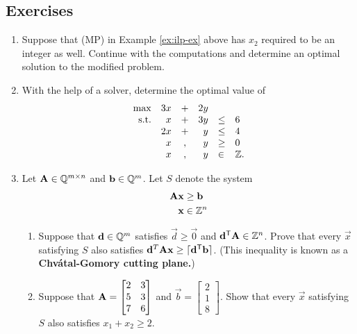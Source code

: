 \subsection*{Exercises}\label{exercises-10}

\begin{enumerate}
\def\labelenumi{\arabic{enumi}.}
\item
  Suppose that (MP) in Example \ref{ex:ilp-ex} above has \(x_2\)
  required to be an integer as well. Continue with the computations and
  determine an optimal solution to the modified problem.
\item
  With the help of a solver, determine the optimal value of
  \[\begin{array}{rrcrll}
  \max & 3x & + & 2y & \\
  \mbox{s.t.} 
  & x & + & 3y & \leq & 6 \\
  & 2x & +&  y & \leq & 4 \\
  & x & ,& y & \geq & 0 \\
  & x &,& y & \in  & {\mathbb{Z}}. \\
  \end{array}\]
\item
  Let \(\mathbf{A} \in {\mathbb{Q}}^{m\times n}\) and \(\mathbf{b} \in {\mathbb{Q}}^m\). Let
  \(S\) denote the system
  \begin{align*}
    \mathbf{A} \mathbf{x} & \geq \mathbf{b}\\
    \mathbf{x} & \in {\mathbb{Z}}^n
  \end{align*}

  \begin{enumerate}
  \def\labelenumii{\alph{enumii}.}
  \item
    Suppose that \(\mathbf{d} \in {\mathbb{Q}}^m\) satisfies
    \(\vec{d} \geq \vec{0}\) and \(\mathbf{d}^{\mathsf{T}}\mathbf{A} \in {\mathbb{Z}}^n\). Prove
    that every \(\vec{x}\) satisfying \(S\) also satisfies
    \(\mathbf{d}^T\mathbf{A} \mathbf{x} \geq \lceil \mathbf{d}^{\mathsf{T}}\mathbf{b}\rceil\).
    (This inequality is known as a \textbf{Chvátal-Gomory cutting
    plane.})
  \item
    Suppose that
    \(\mathbf{A} = \begin{bmatrix} 2 & 3 \\ 5 & 3 \\ 7 & 6 \end{bmatrix}\)
    and \(\vec{b} = \begin{bmatrix} 2 \\ 1 \\ 8\end{bmatrix}\). Show
    that every \(\vec{x}\) satisfying \(S\) also satisfies
    \(x_1 + x_2 \geq 2\).
  \end{enumerate}
\end{enumerate}

